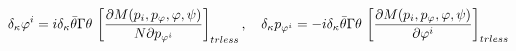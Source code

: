 \begin{equation}\label{kf}
\delta_\kappa\varphi^i=i\delta_\kappa\bar\theta\Gamma\theta\,
\left[{{\partial M(p_i,p_{\varphi},\varphi,\psi)}\over{N\partial
p_{\varphi^i}}}\right]_{trless},\quad \delta_\kappa p_{\varphi^i}=
-i\delta_\kappa\bar\theta\Gamma\theta\, \left[{{\partial
M(p_i,p_{\varphi},\varphi,\psi)}\over{\partial
\varphi^i}}\right]_{trless}
\end{equation}

